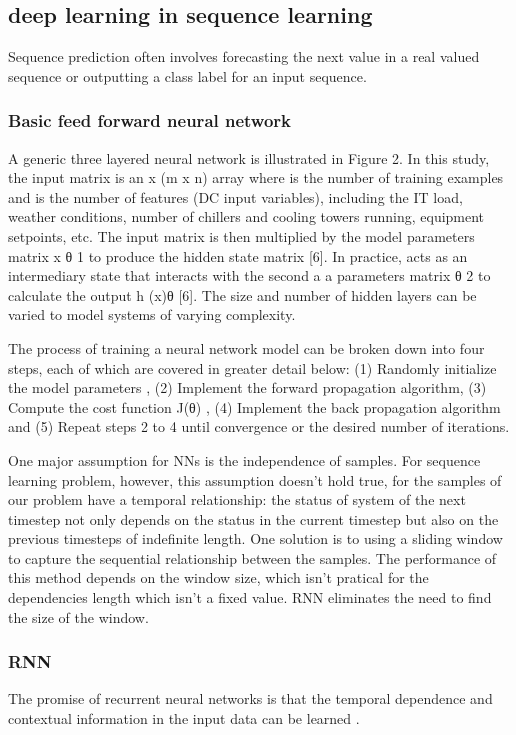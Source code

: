\documentclass[5p]{elsarticle}
\begin{document}
\subsection{deep learning in sequence learning}
Sequence prediction often involves forecasting the next value in a real valued sequence or outputting a class label for an input sequence.
\subsubsection{Basic feed forward neural network}
A generic three layered neural network is illustrated in Figure 2. In this study, the input matrix is an x (m x n) array where is the number of training examples and is the number of features (DC input variables), including the IT load, weather conditions, number of chillers and cooling towers running, equipment setpoints, etc. The input matrix is then multiplied by the model parameters matrix x θ 1 to produce the hidden state matrix [6]. In practice, acts as an intermediary state that interacts with the second a a parameters matrix θ 2 to calculate the output h (x)θ [6]. The size and number of hidden layers can be varied to model systems of varying complexity.

The process of training a neural network model can be broken down into four steps, each of which are covered in greater detail below: (1) Randomly initialize the model parameters , (2) Implement the forward propagation algorithm, (3) Compute the cost function J(θ) , (4) Implement the back propagation algorithm and (5) Repeat steps 2 to 4 until convergence or the desired number of iterations.

One major assumption for NNs is the independence of samples. For sequence learning problem, however, this assumption doesn't hold true, for the samples of our problem have a temporal relationship: the status of system of the next timestep not only depends on the status in the current timestep but also on the previous timesteps of indefinite length. One solution is to using a sliding window to capture the sequential relationship between the samples. The performance of this method depends on the window size, which isn't pratical for the dependencies length which isn't a fixed value. RNN eliminates the need to find the size of the window.

\subsubsection{RNN}
The promise of recurrent neural networks is that the temporal dependence and contextual
information in the input data can be learned\cite{Bengio1994LearningDifficult} \cite{ChoLearningTranslation}. 
\end{document}
